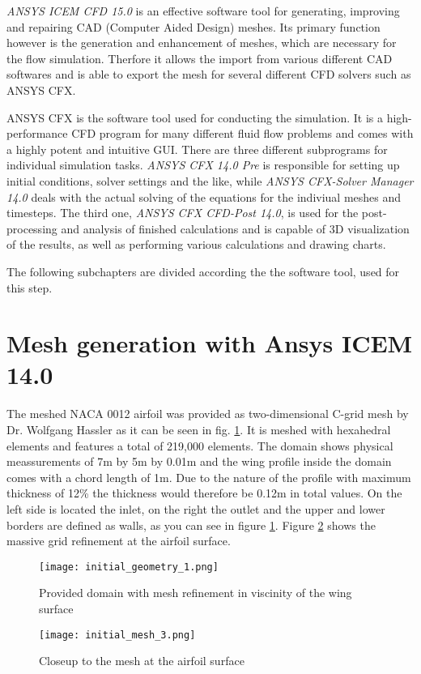 \emph{ANSYS ICEM CFD 15.0} is an effective software tool for generating, improving and repairing CAD (Computer Aided Design) meshes. Its primary function however is the generation and enhancement of meshes, which are necessary for the flow simulation. Therfore it allows the import from various different CAD softwares and is able to export the mesh for several different CFD solvers such as ANSYS CFX.
	
ANSYS CFX is the software tool used for conducting the simulation. It is a high-performance CFD program for many different fluid flow problems and comes with a highly potent and intuitive GUI. There are three different subprograms for individual simulation tasks. \emph{ANSYS CFX 14.0 Pre} is responsible for setting up initial conditions, solver settings and the like, while \emph{ANSYS CFX-Solver Manager 14.0} deals with the actual solving of the equations for the indiviual meshes and timesteps. The third one, \emph{ANSYS CFX CFD-Post 14.0}, is used for the post-processing and analysis of finished calculations and is capable of 3D visualization of the results, as well as performing various calculations and drawing charts.

The following subchapters are divided according the the software tool, used for this step.
\section{Mesh generation with Ansys ICEM 14.0}
The meshed NACA 0012 airfoil was provided as two-dimensional C-grid mesh by Dr. Wolfgang Hassler as it can be seen in fig. \ref{fig:init_mesh}. It is meshed with hexahedral elements and features a total of 219,000 elements. The domain shows physical meassurements of 7m by 5m by 0.01m and the wing profile inside the domain comes with a chord length of 1m. Due to the nature of the profile with maximum thickness of 12\% the thickness would therefore be 0.12m in total values. On the left side is located the inlet, on the right the outlet and the upper and lower borders are defined as walls, as you can see in figure \ref{fig:init_mesh}. Figure \ref{fig:mesh_closeup} shows the massive grid refinement at the airfoil surface.
\begin{figure}[ht]
\centering
\texttt{[image: initial\_geometry\_1.png]}
\caption{Provided domain with mesh refinement in viscinity of the wing surface}
\label{fig:init_mesh}
\end{figure}

\begin{figure}[ht]
\centering
\texttt{[image: initial\_mesh\_3.png]}
\caption{Closeup to the mesh at the airfoil surface}
\label{fig:mesh_closeup}
\end{figure}

